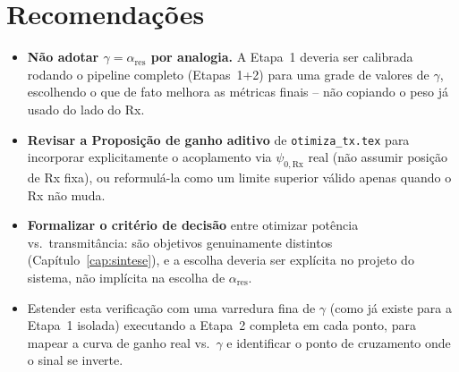 \documentclass[12pt,a4paper,oneside]{book}
\theoremstyle{definition}
\theoremstyle{remark}
\begin{document}
\section{Recomendações}

\begin{itemize}
  \item \textbf{Não adotar $\gamma=\alpha_{\mathrm{res}}$ por analogia.} A
  Etapa~1 deveria ser calibrada rodando o pipeline completo (Etapas~1+2)
  para uma grade de valores de $\gamma$, escolhendo o que de fato melhora
  as métricas finais -- não copiando o peso já usado do lado do Rx.
  \item \textbf{Revisar a Proposição de ganho aditivo} de
  \texttt{otimiza\_tx.tex} para incorporar explicitamente o acoplamento via
  $\psi_{0,\mathrm{Rx}}$ real (não assumir posição de Rx fixa), ou
  reformulá-la como um limite superior válido apenas quando o Rx não muda.
  \item \textbf{Formalizar o critério de decisão} entre otimizar potência
  vs.\ transmitância: são objetivos genuinamente distintos
  (Capítulo~\ref{cap:sintese}), e a escolha deveria ser explícita no
  projeto do sistema, não implícita na escolha de $\alpha_{\mathrm{res}}$.
  \item Estender esta verificação com uma varredura fina de $\gamma$ (como
  já existe para a Etapa~1 isolada) executando a Etapa~2 completa em cada
  ponto, para mapear a curva de ganho real vs.\ $\gamma$ e identificar o
  ponto de cruzamento onde o sinal se inverte.
\end{itemize}
\end{document}
